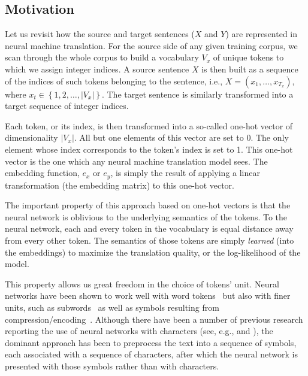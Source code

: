 \documentclass[11pt]{article}
\begin{document}
\subsection{Motivation}

Let us revisit how the source and target sentences ($X$ and $Y$) are represented
in neural machine translation. For the source side of any given training corpus,
we scan through the whole corpus to build a vocabulary $V_x$ of unique tokens to
which we assign integer indices.  A source sentence $X$ is then built as a
sequence of the indices of such tokens belonging to the sentence, i.e., $X=(x_1,
\ldots, x_{T_x})$, where $x_t \in \left\{ 1, 2, \ldots, |V_x|\right\}$. The
target sentence is similarly transformed into a target sequence of integer
indices. 

Each token, or its index, is then transformed into a so-called one-hot vector of
dimensionality $|V_x|$.  All but one elements of this vector are set to 0. The
only element whose index corresponds to the token's index is set to 1. This
one-hot vector is the one which any neural machine translation model sees. The
embedding function, $e_x$ or $e_y$, is simply the result of applying a linear transformation
(the embedding matrix) to this one-hot vector.

The important property of this approach based on one-hot vectors is that the
neural network is oblivious to the underlying semantics of the tokens. To the
neural network, each and every token in the vocabulary is equal distance away
from every other token. The semantics of those tokens are simply {\em learned}
(into the embeddings) to maximize the translation quality, or the log-likelihood of the model.

This property allows us great freedom in the choice of tokens' unit. Neural
networks have been shown to work well with word tokens~\cite{bengio2001neural,schwenk2007continuous,mikolov2010recurrent}
but also with finer units, such as
subwords~\cite{sennrich2015neural,botha2014compositional,luong2013better} as well as
symbols resulting from compression/encoding~\cite{chitnis2015variable}. Although
there have been a number of previous research reporting the use of neural
networks with characters (see, e.g.,  and ),
the dominant approach has been to preprocess the text into a sequence of symbols, each associated
with a sequence of characters,
after which the neural network is presented with those symbols rather than
with characters.
\end{document}
